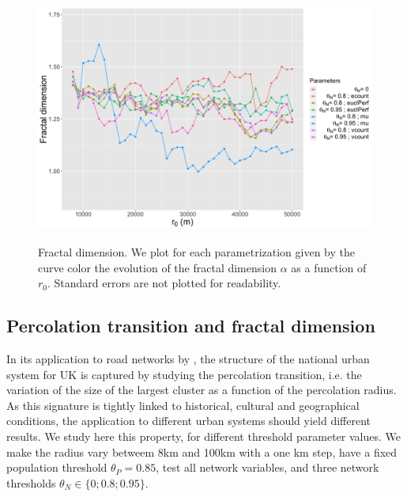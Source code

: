 \documentclass{article}
\begin{document}
\begin{figure}[ht] 
  {\includegraphics[width=\linewidth]{fractaldimension.png}}
  \centering
  \caption{Fractal dimension. We plot for each parametrization given by the curve color the evolution of the fractal dimension $\alpha$ as a function of $r_0$. Standard errors are not plotted for readability.\label{fig:fractaldim}}
\end{figure}

\subsection{Percolation transition and fractal dimension}



In its application to road networks by \cite{arcaute2016cities}, the structure of the national urban system for UK is captured by studying the percolation transition, i.e. the variation of the size of the largest cluster as a function of the percolation radius. As this signature is tightly linked to historical, cultural and geographical conditions, the application to different urban systems should yield different results. We study here this property, for different threshold parameter values. We make the radius vary betweem 8km and 100km with a one km step, have a fixed population threshold $\theta_P = 0.85$, test all network variables, and three network thresholds $\theta_N \in \{ 0 ; 0.8 ; 0.95 \}$.
\end{document}

